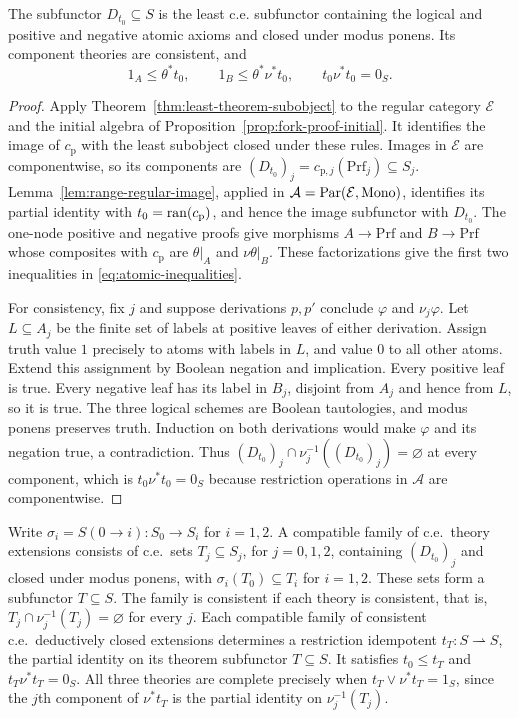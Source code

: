 \begin{theorem}\label{thm:fork-proof-presentation}
The subfunctor $D_{t_0}\subseteq S$ is the least c.e. subfunctor
containing the logical and positive and negative atomic axioms and
closed under modus ponens. Its component theories are consistent,
and
\begin{equation}\label{eq:atomic-inequalities}
 1_A\le\theta^*t_0,\qquad
 1_B\le\theta^*\nu^*t_0,\qquad t_0\nu^*t_0=0_S.
\end{equation}
\end{theorem}
\begin{proof}
Apply Theorem~\ref{thm:least-theorem-subobject} to the regular
category $\mathcal E$ and the initial algebra of
Proposition~\ref{prop:fork-proof-initial}. It identifies the image
of $c_{\mathrm p}$ with the least subobject closed under these rules. Images
in $\mathcal E$ are componentwise, so its components are
$(D_{t_0})_j=c_{\mathrm p,j}(\mathrm{Prf}_j)\subseteq S_j$.
Lemma~\ref{lem:range-regular-image}, applied in
$\mathcal A=\operatorname{Par}(\mathcal E,\operatorname{Mono})$, identifies its partial identity
with $t_0=\operatorname{ran}(c_{\mathrm p})$, and hence the image subfunctor with $D_{t_0}$.
The one-node positive and negative proofs give morphisms
$A\to\mathrm{Prf}$ and $B\to\mathrm{Prf}$ whose composites
with $c_{\mathrm p}$ are $\theta|_A$ and $\nu\theta|_B$. These factorizations
give the first two inequalities in \eqref{eq:atomic-inequalities}.

For consistency, fix $j$ and suppose derivations $p,p'$ conclude
$\varphi$ and $\nu_j\varphi$. Let $L\subseteq A_j$ be the finite
set of labels at positive leaves of either derivation. Assign truth
value $1$ precisely to atoms with labels in $L$, and value $0$ to
all other atoms. Extend this assignment by Boolean negation and
implication. Every positive leaf is true. Every negative leaf has
its label in $B_j$, disjoint from $A_j$ and hence from $L$, so it
is true. The three logical schemes are Boolean tautologies, and
modus ponens preserves truth. Induction on both derivations would
make $\varphi$ and its negation true, a contradiction. Thus
$(D_{t_0})_j\cap\nu_j^{-1}((D_{t_0})_j)=\varnothing$ at every component, which
is $t_0\nu^*t_0=0_S$ because restriction operations in
$\mathcal A$ are componentwise.
\end{proof}

Write $\sigma_i=S(0\to i):S_0\to S_i$ for $i=1,2$.
A compatible family of c.e.\ theory extensions consists of c.e.\ sets
$T_j\subseteq S_j$, for $j=0,1,2$, containing $(D_{t_0})_j$ and closed
under modus ponens, with $\sigma_i(T_0)\subseteq T_i$ for $i=1,2$.
These sets form a subfunctor $T\subseteq S$.
The family is consistent if each theory is consistent, that is,
$T_j\cap\nu_j^{-1}(T_j)=\varnothing$ for every $j$.
Each compatible family of consistent c.e.\ deductively closed extensions
determines a restriction idempotent $t_T:S\rightharpoonup S$, the partial
identity on its theorem subfunctor $T\subseteq S$.
It satisfies $t_0\le t_T$ and $t_T\nu^*t_T=0_S$.
All three theories are complete precisely when
$t_T\vee\nu^*t_T=1_S$, since the $j$th component of $\nu^*t_T$
is the partial identity on $\nu_j^{-1}(T_j)$.

